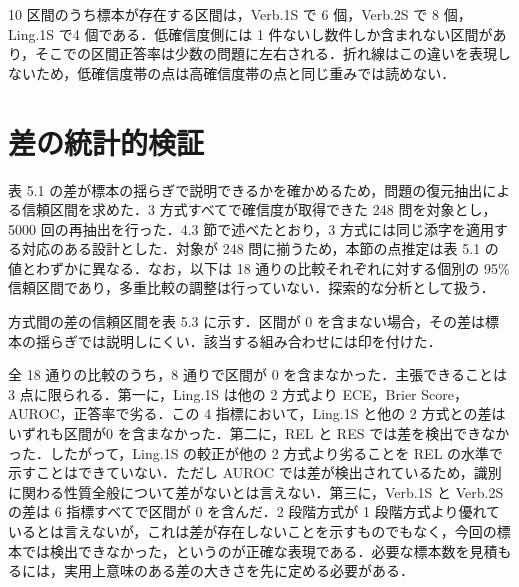 10 区間のうち標本が存在する区間は，Verb.1S で 6 個，Verb.2S で 8 個，Ling.1S で4 個である．低確信度側には 1 件ないし数件しか含まれない区間があり，そこでの区間正答率は少数の問題に左右される．折れ線はこの違いを表現しないため，低確信度帯の点は高確信度帯の点と同じ重みでは読めない．

\section{差の統計的検証}

表 5.1 の差が標本の揺らぎで説明できるかを確かめるため，問題の復元抽出による信頼区間を求めた．3 方式すべてで確信度が取得できた 248 問を対象とし，5000 回の再抽出を行った．4.3 節で述べたとおり，3 方式には同じ添字を適用する対応のある設計とした．対象が 248 問に揃うため，本節の点推定は表 5.1 の値とわずかに異なる．なお，以下は 18 通りの比較それぞれに対する個別の 95\% 信頼区間であり，多重比較の調整は行っていない．探索的な分析として扱う．

方式間の差の信頼区間を表 5.3 に示す．区間が 0 を含まない場合，その差は標本の揺らぎでは説明しにくい．該当する組み合わせには印を付けた．

\begin{table}[htbp]
\centering
\small
\caption{方式間の差の 95\% 信頼区間（共通 248 問，† は区間が 0 を含まない）}
\label{tab:5.3}
\end{table}

全 18 通りの比較のうち，8 通りで区間が 0 を含まなかった．主張できることは3 点に限られる．第一に，Ling.1S は他の 2 方式より ECE，Brier Score，AUROC，正答率で劣る．この 4 指標において，Ling.1S と他の 2 方式との差はいずれも区間が0 を含まなかった．第二に，REL と RES では差を検出できなかった．したがって，Ling.1S の較正が他の 2 方式より劣ることを REL の水準で示すことはできていない．ただし AUROC では差が検出されているため，識別に関わる性質全般について差がないとは言えない．第三に，Verb.1S と Verb.2S の差は 6 指標すべてで区間が 0 を含んだ．2 段階方式が 1 段階方式より優れているとは言えないが，これは差が存在しないことを示すものでもなく，今回の標本では検出できなかった，というのが正確な表現である．必要な標本数を見積もるには，実用上意味のある差の大きさを先に定める必要がある．


